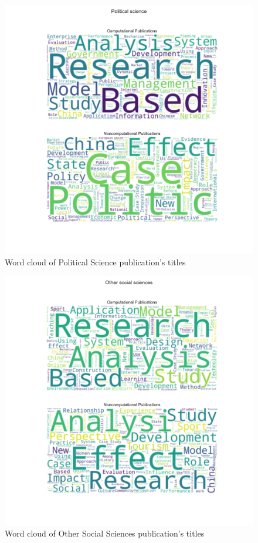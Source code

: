 \documentclass[12pt, a4paper]{article}
\begin{document}
\begin{figure}[ht]
	\centering
	\includegraphics[width=\textwidth]{wc_Political_Science}
	\caption{Word cloud of Political Science publication's titles}
\end{figure}
\begin{figure}[ht]
	\centering
	\includegraphics[width=\textwidth]{wc_Other_Social_Sciences}
	\caption{Word cloud of Other Social Sciences publication's titles}
\end{figure}
\end{document}
